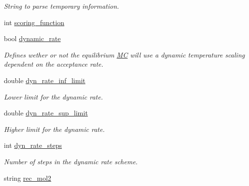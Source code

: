 \begin{DoxyCompactItemize}
\begin{DoxyCompactList}\small\item\em String to parse temporary information. \item\end{DoxyCompactList}\item 
int \hyperlink{classPARSER_ad4acb599b6863a95916e0646d27acdd0}{scoring\_\-function}
\item 
\hypertarget{classPARSER_a63252f63d49e1e20e9f93e7c5a9997b0}{
bool \hyperlink{classPARSER_a63252f63d49e1e20e9f93e7c5a9997b0}{dynamic\_\-rate}}
\label{classPARSER_a63252f63d49e1e20e9f93e7c5a9997b0}

\begin{DoxyCompactList}\small\item\em Defines wether or not the equilibrium \hyperlink{classMC}{MC} will use a dynamic temperature scaling dependent on the acceptance rate. \item\end{DoxyCompactList}\item 
\hypertarget{classPARSER_adc25c95bc3743182be01af9c74d64f5f}{
double \hyperlink{classPARSER_adc25c95bc3743182be01af9c74d64f5f}{dyn\_\-rate\_\-inf\_\-limit}}
\label{classPARSER_adc25c95bc3743182be01af9c74d64f5f}

\begin{DoxyCompactList}\small\item\em Lower limit for the dynamic rate. \item\end{DoxyCompactList}\item 
\hypertarget{classPARSER_a6b7b22494c268e2e0f26363e5711cecd}{
double \hyperlink{classPARSER_a6b7b22494c268e2e0f26363e5711cecd}{dyn\_\-rate\_\-sup\_\-limit}}
\label{classPARSER_a6b7b22494c268e2e0f26363e5711cecd}

\begin{DoxyCompactList}\small\item\em Higher limit for the dynamic rate. \item\end{DoxyCompactList}\item 
\hypertarget{classPARSER_aaf97507aadae947f091b0e9bb94db6d7}{
int \hyperlink{classPARSER_aaf97507aadae947f091b0e9bb94db6d7}{dyn\_\-rate\_\-steps}}
\label{classPARSER_aaf97507aadae947f091b0e9bb94db6d7}

\begin{DoxyCompactList}\small\item\em Number of steps in the dynamic rate scheme. \item\end{DoxyCompactList}\item 
\hypertarget{classPARSER_a30516b63f90f0b855494207c576793ff}{
string \hyperlink{classPARSER_a30516b63f90f0b855494207c576793ff}{rec\_\-mol2}}
\label{classPARSER_a30516b63f90f0b855494207c576793ff}


\end{DoxyCompactItemize}
